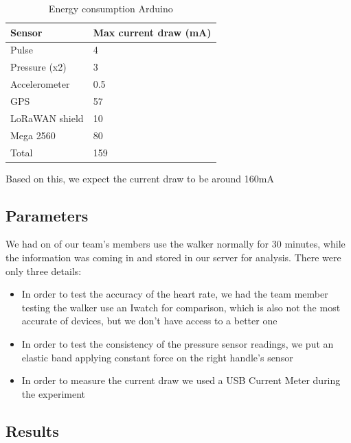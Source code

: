 			\begin{table}[h]
				\begin{tabular}{@{}ll@{}}
					\toprule
					Sensor         & Max current draw (mA) \\ \midrule
					Pulse          & 4                     \\
					Pressure (x2)  & 3                     \\
					Accelerometer  & 0.5                   \\
					GPS            & 57                    \\
					LoRaWAN shield & 10                    \\
					Mega 2560      & 80                    \\
					Total          & 159                   \\ \bottomrule
				\end{tabular}
				\caption[Energy consumption Arduino]{Energy consumption Arduino}
				\label{tab:EnergyConsumption}
			\end{table}

			Based on this, we expect the current draw to be around 160mA

	\subsection{Parameters}
		We had on of our team's members use the walker normally for 30 minutes, while the information was coming in and stored in our server for analysis. There were only three details:

		\begin{itemize}
		  \item In order to test the accuracy of the heart rate, we had the team member testing the walker use an Iwatch for comparison, which is also not the most accurate of devices, but we don't have access to a better one
		  \item In order to test the consistency of the pressure sensor readings, we put an elastic band applying constant force on the right handle's sensor
		  \item In order to measure the current draw we used a USB Current Meter during the experiment
		\end{itemize}

	\subsection{Results}
		
